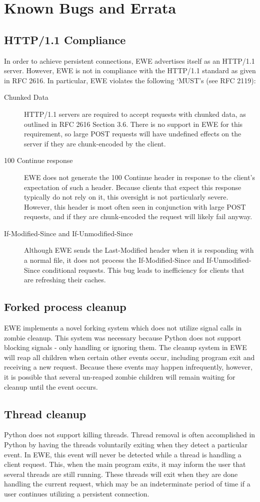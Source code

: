 \documentclass{article}
\begin{document}
\section{Known Bugs and Errata}\label{bugs}
\subsection{HTTP/1.1 Compliance}
In order to achieve persistent connections, EWE advertises itself as an HTTP/1.1 server.
However, EWE is not in compliance with the HTTP/1.1 standard as given in RFC 2616.
In particular, EWE violates the following `MUST's (see RFC 2119):
\begin{description}
\item[Chunked Data] HTTP/1.1 servers are required to accept requests with chunked data, as outlined in RFC 2616 Section 3.6.
There is no support in EWE for this requirement, so large POST requests will have undefined effects on the server if they are chunk-encoded by the client.
\item[100 Continue response] EWE does not generate the 100 Continue header in response to the client's expectation of such a header.
Because clients that expect this response typically do not rely on it, this oversight is not particularly severe.
However, this header is most often seen in conjunction with large POST requests, and if they are chunk-encoded the request will likely fail anyway.
\item[If-Modified-Since and If-Unmodified-Since] Although EWE sends the Last-Modified header when it is responding with a normal file, it does not process the If-Modified-Since and If-Unmodified-Since conditional requests.
This bug leads to inefficiency for clients that are refreshing their caches.
\end{description}

\subsection{Forked process cleanup}
EWE implements a novel forking system which does not utilize signal calls in zombie cleanup.
This system was necessary because Python does not support blocking signals - only handling or ignoring them.
The cleanup system in EWE will reap all children when certain other events occur, including program exit and receiving a new request.
Because these events may happen infrequently, however, it is possible that several un-reaped zombie children will remain waiting for cleanup until the event occurs.

\subsection{Thread cleanup}
Python does not support killing threads.
Thread removal is often accomplished in Python by having the threads voluntarily exiting when they detect a particular event.
In EWE, this event will never be detected while a thread is handling a client request.
This, when the main program exits, it may inform the user that several threads are still running.
These threads will exit when they are done handling the current request, which may be an indeterminate period of time if a user continues utilizing a persistent connection.
\end{document}
